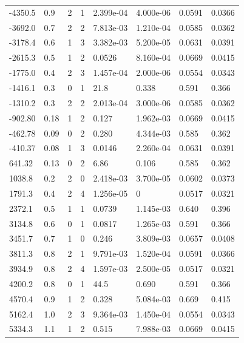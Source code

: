 \documentclass[preview]{standalone}
\begin{document}
{{\begin{tabular}{L{1.2cm}C{1.2cm} C{0.3cm}C{0.5cm} C{1.4cm}C{1.4cm} C{1.4cm}C{1.4cm}}
  -4350.5  &   0.9  & 2     &  1 &  2.399e-04  & 4.000e-06  & 0.0591 &  0.0366   \\ 
  -3692.0  &   0.7  & 2     &  2 &  7.813e-03  & 1.210e-04  & 0.0585 &  0.0362   \\ 
  -3178.4  &   0.6  & 1     &  3 &  3.382e-03  & 5.200e-05  & 0.0631 &  0.0391   \\ 
  -2615.3  &   0.5  & 1     &  2 &  0.0526  & 8.160e-04  & 0.0669 &  0.0415   \\ 
  -1775.0  &   0.4  & 2     &  3 &  1.457e-04  & 2.000e-06  & 0.0554 &  0.0343   \\ 
  -1416.1  &   0.3  & 0     &  1 &  21.8  & 0.338  & 0.591 &  0.366   \\ 
  -1310.2  &   0.3  & 2     &  2 &  2.013e-04  & 3.000e-06  & 0.0585 &  0.0362   \\ 
  -902.80  &  0.18  & 1     &  2 &  0.127  & 1.962e-03  & 0.0669 &  0.0415   \\ 
  -462.78  &  0.09  & 0     &  2 &  0.280  & 4.344e-03  & 0.585 &  0.362   \\ 
  -410.37  &  0.08  & 1     &  3 &  0.0146  & 2.260e-04  & 0.0631 &  0.0391   \\ 
  641.32  &  0.13  & 0     &  2 &  6.86  & 0.106  & 0.585 &  0.362   \\ 
  1038.8  &   0.2  & 2     &  0 &  2.418e-03  & 3.700e-05  & 0.0602 &  0.0373   \\ 
  1791.3  &   0.4  & 2     &  4 &  1.256e-05  & 0  & 0.0517 &  0.0321   \\ 
  2372.1  &   0.5  & 1     &  1 &  0.0739  & 1.145e-03  & 0.640 &  0.396   \\ 
  3134.8  &   0.6  & 0     &  1 &  0.0817  & 1.265e-03  & 0.591 &  0.366   \\ 
  3451.7  &   0.7  & 1     &  0 &  0.246  & 3.809e-03  & 0.0657 &  0.0408   \\ 
  3811.3  &   0.8  & 2     &  1 &  9.791e-03  & 1.520e-04  & 0.0591 &  0.0366   \\ 
  3934.9  &   0.8  & 2     &  4 &  1.597e-03  & 2.500e-05  & 0.0517 &  0.0321   \\ 
  4200.2  &   0.8  & 0     &  1 &  44.5  & 0.690  & 0.591 &  0.366   \\ 
  4570.4  &   0.9  & 1     &  2 &  0.328  & 5.084e-03  & 0.669 &  0.415   \\ 
  5162.4  &   1.0  & 2     &  3 &  9.364e-03  & 1.450e-04  & 0.0554 &  0.0343   \\ 
  5334.3  &   1.1  & 1     &  2 &  0.515  & 7.988e-03  & 0.0669 &  0.0415   \\ 

\end{tabular}}}
\end{document}
